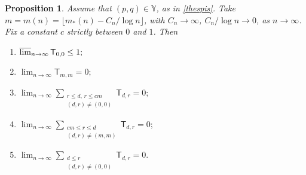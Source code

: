 \documentclass[reqno]{amsart}
\theoremstyle{theorem}
\newtheorem{proposition}[theorem]{Proposition}
\theoremstyle{definition}
\theoremstyle{remark}
\newcommand{\1}{{\text{\Large $\mathfrak 1$}}}	%
\renewcommand{\limsup}{\varlimsup}
\numberwithin{equation}{section}
\def\Y{\mathbb{Y}}
\def\TTT{\mathsf T}
\begin{document}
\begin{proposition}
\label{allterms}
Assume that $(p, q) \in \Y$, as in \eqref{thespis}.
Take $m=m(n) = \lfloor m_*(n) - C_n/\log n\rfloor$, 
with $C_n \to \infty$, $C_n/\log n \to 0$,
as $n \to \infty$.
Fix a constant $c$ strictly between $0$ and $1$. Then
\begin{enumerate}[\rm (i)]
\item
$\limsup_{n \to \infty} \TTT_{0,0} \le 1;$
\item
$\lim_{n \to \infty} \TTT_{m,m}= 0;$
\item
$\lim_{n \to \infty} \displaystyle \sum_{\substack{r\le d,\,r\le cm \\ (d,r)\neq (0,0) }} \TTT_{d,r} = 0;$
\item
$\lim_{n \to \infty} \displaystyle 
\sum_{\substack{cm \le r \le d \\ (d,r) \neq (m,m) }} \TTT_{d,r} = 0;$
\item
$\lim_{n \to \infty} \displaystyle \sum_{\substack{d \le r\\(d,r) \neq(0,0)}} 
\TTT_{d,r} = 0.$
\end{enumerate}
\end{proposition}
\end{document}

